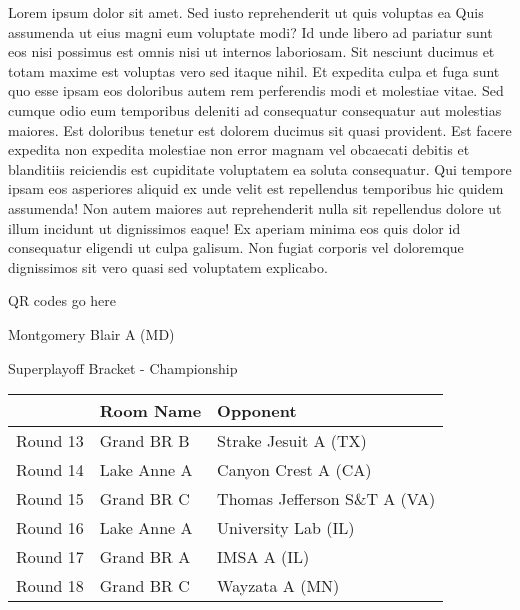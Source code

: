 \documentclass{article}%
\begin{document}
\newline%
Lorem ipsum dolor sit amet. Sed iusto reprehenderit ut quis voluptas ea Quis assumenda ut eius magni eum voluptate modi? Id unde libero ad pariatur sunt eos nisi possimus est omnis nisi ut internos laboriosam. Sit nesciunt ducimus et totam maxime est voluptas vero sed itaque nihil. Et expedita culpa et fuga sunt quo esse ipsam eos doloribus autem rem perferendis modi et molestiae vitae.\newline%
\newline%
Sed cumque odio eum temporibus deleniti ad consequatur consequatur aut molestias maiores. Est doloribus tenetur est dolorem ducimus sit quasi provident. Est facere expedita non expedita molestiae non error magnam vel obcaecati debitis et blanditiis reiciendis est cupiditate voluptatem ea soluta consequatur. Qui tempore ipsam eos asperiores aliquid ex unde velit est repellendus temporibus hic quidem assumenda!\newline%
\newline%
Non autem maiores aut reprehenderit nulla sit repellendus dolore ut illum incidunt ut dignissimos eaque! Ex aperiam minima eos quis dolor id consequatur eligendi ut culpa galisum. Non fugiat corporis vel doloremque dignissimos sit vero quasi sed voluptatem explicabo.\newline%
\newline%
%
\vspace*{30pt}%
\begin{center}%
\begin{Huge}%
QR codes go here%
\end{Huge}%
\end{center}%
\newpage%
\begin{center}%
\begin{Huge}%
Montgomery Blair A (MD)%
\end{Huge}%
\vspace*{8pt}%
\linebreak%
\begin{Large}%
Superplayoff Bracket {-} Championship%
\end{Large}%
\end{center}%
%
\begin{tabularx}{\textwidth}{|c|Y|Y|}%
\hline%
&Room Name&Opponent\\%
\hline%
Round 13&Grand BR B&Strake Jesuit A (TX)\\%
Round 14&Lake Anne A&Canyon Crest A (CA)\\%
Round 15&Grand BR C&Thomas Jefferson S\&T A (VA)\\%
Round 16&Lake Anne A&University Lab (IL)\\%
Round 17&Grand BR A&IMSA A (IL)\\%
Round 18&Grand BR C&Wayzata A (MN)\\%
\hline%
\end{tabularx}%
\end{document}
